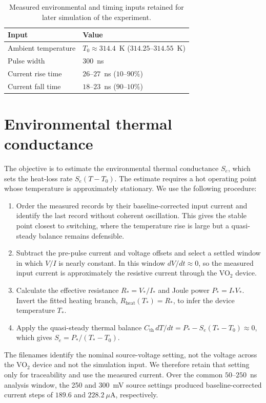 \documentclass[11pt]{article}
\begin{document}
\begin{table}[H]
\centering
\small
{}
\begin{tabularx}{0.78\textwidth}{@{}l X@{}}
\toprule
Input & Value \\
\midrule
Ambient temperature & $T_0\approx314.4$~K ($314.25$--$314.55$~K) \\
Pulse width & $300$~ns \\
Current rise time & $26$--$27$~ns ($10$--$90\%$) \\
Current fall time & $18$--$23$~ns ($90$--$10\%$) \\
\bottomrule
\end{tabularx}
\caption{Measured environmental and timing inputs retained for later simulation of the experiment.}
\label{tab:experimental_conditions}
\end{table}

\section{Environmental thermal conductance}

The objective is to estimate the environmental thermal conductance $S_e$, which
sets the heat-loss rate $S_e(T-T_0)$. The estimate requires a hot operating point
whose temperature is approximately stationary. We use the following procedure:

\begin{enumerate}
\item Order the measured records by their baseline-corrected input current and
identify the last record without coherent oscillation. This gives the stable point
closest to switching, where the temperature rise is large but a quasi-steady
balance remains defensible.
\item Subtract the pre-pulse current and voltage offsets and select a settled window
in which $V/I$ is nearly constant. In this window $dV/dt\approx0$, so the measured
input current is approximately the resistive current through the VO$_2$ device.
\item Calculate the effective resistance $R_*=V_*/I_*$ and Joule power
$P_*=I_*V_*$. Invert the fitted heating branch, $R_{\mathrm{heat}}(T_*)=R_*$,
to infer the device temperature $T_*$.
\item Apply the quasi-steady thermal balance
$C_{\mathrm{th}}\,dT/dt=P_*-S_e(T_*-T_0)\approx0$, which gives
$S_e=P_*/(T_*-T_0)$.
\end{enumerate}

The filenames identify the nominal source-voltage setting, not the voltage across
the VO$_2$ device and not the simulation input. We therefore retain that setting
only for traceability and use the measured current. Over the common $50$--$250$~ns
analysis window, the 250 and 300~mV source settings produced baseline-corrected
current steps of $189.6$ and $228.2~\mu$A, respectively.
\end{document}
